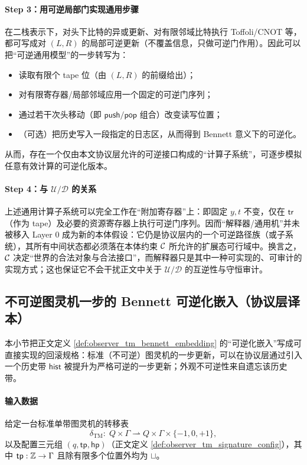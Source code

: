 \paragraph{Step 3：用可逆局部门实现通用步骤}
在二栈表示下，对头下比特的异或更新、对有限邻域比特执行 Toffoli/CNOT 等，都可写成对 \((L,R)\) 的局部可逆更新（不覆盖信息，只做可逆门作用）。因此可以把“可逆通用模型”的一步转写为：
\begin{itemize}
  \item 读取有限个 tape 位（由 \((L,R)\) 的前缀给出）；
  \item 对有限寄存器/局部邻域应用一个固定的可逆门序列；
  \item 通过若干次头移动（即 \(\mathsf{push}/\mathsf{pop}\) 组合）改变读写位置；
  \item （可选）把历史写入一段指定的日志区，从而得到 Bennett 意义下的可逆化。
\end{itemize}
从而，存在一个仅由本文协议层允许的可逆接口构成的“计算子系统”，可逐步模拟任意有效计算的可逆化版本。

\paragraph{Step 4：与 \(\mathcal U/\mathcal D\) 的关系}
上述通用计算子系统可以完全工作在“附加寄存器”上：即固定 \(y,t\) 不变，仅在 \(\mathsf{tr}\)（作为 tape）及必要的资源寄存器上执行可逆门序列。因而“解释器/通用机”并未被移入 Layer 0 成为新的本体假设：它仍是协议层内的一个可逆路径族（或子系统），其所有中间状态都必须落在本体约束 \(\mathcal{C}\) 所允许的扩展态可行域中。换言之，\(\mathcal{C}\) 决定“世界的合法对象与合法接口”，而解释器只是其中一种可实现的、可审计的实现方式；这也保证它不会干扰正文中关于 \(\mathcal U/\mathcal D\) 的互逆性与守恒审计。

\subsection{不可逆图灵机一步的 Bennett 可逆化嵌入（协议层译本）}\label{app:bennett_embedding_otm}
本小节把正文定义 \ref{def:observer_tm_bennett_embedding} 的“可逆化嵌入”写成可直接实现的回滚规格：标准（不可逆）图灵机的一步更新，可以在协议层通过引入一个历史带 \(\mathsf{hist}\) 被提升为严格可逆的一步更新；外观不可逆性来自遗忘该历史带。

\paragraph{输入数据}
给定一台标准单带图灵机的转移表
$$
\delta_{\mathrm{TM}}:\;Q\times\Gamma\rightharpoonup Q\times\Gamma\times\{-1,0,+1\},
$$
以及配置三元组 \((q,\mathsf{tp},\mathsf{hp})\)（正文定义 \ref{def:observer_tm_signature_config}），其中 \(\mathsf{tp}:\mathbb{Z}\to\Gamma\) 且除有限多个位置外均为 \(\sqcup\)。

